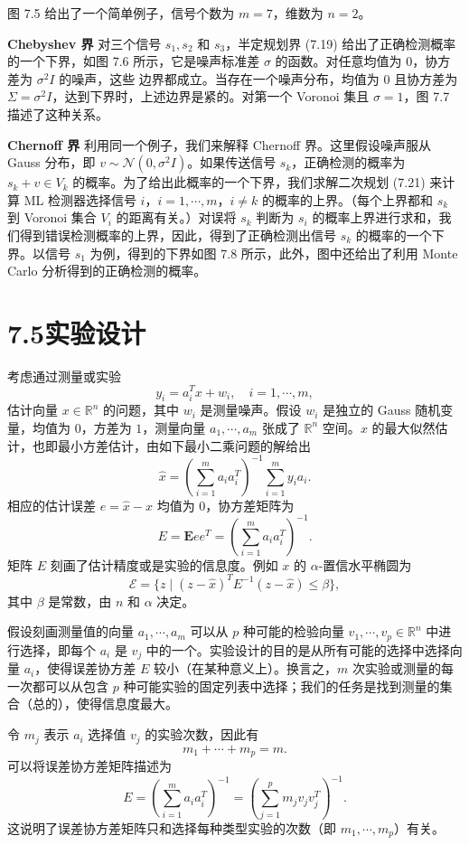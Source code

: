 \documentclass[UTF8,12pt,a4paper,fontset=fandol]{ctexart}
\begin{document}
图 7.5 给出了一个简单例子，信号个数为 $m=7$，维数为 $n=2$。

\noindent\textbf{Chebyshev 界}\quad
对三个信号 $s_1,s_2$ 和 $s_3$，半定规划界 (7.19) 给出了正确检测概率的一个下界，如图 7.6 所示，它是噪声标准差 $\sigma$ 的函数。对任意均值为 $0$，协方差为 $\sigma^2I$ 的噪声，这些
边界都成立。当存在一个噪声分布，均值为 $0$ 且协方差为 $\Sigma=\sigma^2I$，达到下界时，上述边界是紧的。对第一个 Voronoi 集且 $\sigma=1$，图 7.7 描述了这种关系。

\noindent\textbf{Chernoff 界}\quad
利用同一个例子，我们来解释 Chernoff 界。这里假设噪声服从 Gauss 分布，即 $v\sim\mathcal{N}(0,\sigma^2I)$。如果传送信号 $s_k$，正确检测的概率为 $s_k+v\in V_k$ 的概率。为了给出此概率的一个下界，我们求解二次规划 (7.21) 来计算 ML 检测器选择信号
$i$，$i=1,\cdots,m$，$i\neq k$ 的概率的上界。（每个上界都和 $s_k$ 到 Voronoi 集合 $V_i$ 的距离有关。）对误将 $s_k$ 判断为 $s_i$ 的概率上界进行求和，我们得到错误检测概率的上界，因此，得到了正确检测出信号 $s_k$ 的概率的一个下界。以信号 $s_1$ 为例，得到的下界如图 7.8 所示，此外，图中还给出了利用 Monte Carlo 分析得到的正确检测的概率。

\section*{7.5\quad 实验设计}

考虑通过测量或实验
\[
y_i=a_i^Tx+w_i,\quad i=1,\cdots,m,
\]
估计向量 $x\in\mathbb{R}^n$ 的问题，其中 $w_i$ 是测量噪声。假设 $w_i$ 是独立的 Gauss 随机变量，均值为 $0$，方差为 $1$，测量向量 $a_1,\cdots,a_m$ 张成了 $\mathbb{R}^n$ 空间。$x$ 的最大似然估计，也即最小方差估计，由如下最小二乘问题的解给出
\[
\hat{x}=\left(\sum_{i=1}^m a_ia_i^T\right)^{-1}\sum_{i=1}^m y_ia_i.
\]
相应的估计误差 $e=\hat{x}-x$ 均值为 $0$，协方差矩阵为
\[
E=\mathbf{E}ee^T=\left(\sum_{i=1}^m a_ia_i^T\right)^{-1}.
\]
矩阵 $E$ 刻画了估计精度或是实验的信息度。例如 $x$ 的 $\alpha$-置信水平椭圆为
\[
\mathcal{E}=\{z\mid (z-\hat{x})^TE^{-1}(z-\hat{x})\leq \beta\},
\]
其中 $\beta$ 是常数，由 $n$ 和 $\alpha$ 决定。

假设刻画测量值的向量 $a_1,\cdots,a_m$ 可以从 $p$ 种可能的检验向量 $v_1,\cdots,v_p\in\mathbb{R}^n$ 中进行选择，即每个 $a_i$ 是 $v_j$ 中的一个。实验设计的目的是从所有可能的选择中选择向量 $a_i$，使得误差协方差 $E$ 较小（在某种意义上）。换言之，$m$ 次实验或测量的每一次都可以从包含 $p$ 种可能实验的固定列表中选择；我们的任务是找到测量的集合（总的），使得信息度最大。

令 $m_j$ 表示 $a_i$ 选择值 $v_j$ 的实验次数，因此有
\[
m_1+\cdots+m_p=m.
\]
可以将误差协方差矩阵描述为
\[
E=\left(\sum_{i=1}^m a_ia_i^T\right)^{-1}
=\left(\sum_{j=1}^p m_jv_jv_j^T\right)^{-1}.
\]
这说明了误差协方差矩阵只和选择每种类型实验的次数（即 $m_1,\cdots,m_p$）有关。
\end{document}
